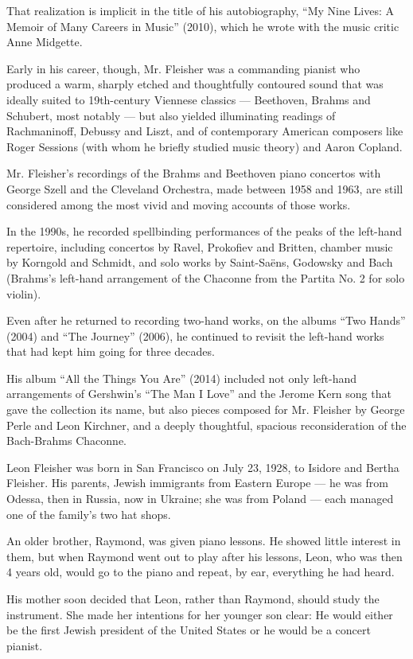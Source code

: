 That realization is implicit in the title of his autobiography, ``My
Nine Lives: A Memoir of Many Careers in Music'' (2010), which he wrote
with the music critic Anne Midgette.

Early in his career, though, Mr. Fleisher was a commanding pianist who
produced a warm, sharply etched and thoughtfully contoured sound that
was ideally suited to 19th-century Viennese classics --- Beethoven,
Brahms and Schubert, most notably --- but also yielded illuminating
readings of Rachmaninoff, Debussy and Liszt, and of contemporary
American composers like Roger Sessions (with whom he briefly studied
music theory) and Aaron Copland.

Mr. Fleisher's recordings of the Brahms and Beethoven piano concertos
with George Szell and the Cleveland Orchestra, made between 1958 and
1963, are still considered among the most vivid and moving accounts of
those works.

In the 1990s, he recorded spellbinding performances of the peaks of the
left-hand repertoire, including concertos by Ravel, Prokofiev and
Britten, chamber music by Korngold and Schmidt, and solo works by
Saint-Saëns, Godowsky and Bach (Brahms's left-hand arrangement of the
Chaconne from the Partita No. 2 for solo violin).

Even after he returned to recording two-hand works, on the albums ``Two
Hands'' (2004) and ``The Journey'' (2006), he continued to revisit the
left-hand works that had kept him going for three decades.

His album ``All the Things You Are'' (2014) included not only left-hand
arrangements of Gershwin's ``The Man I Love'' and the Jerome Kern song
that gave the collection its name, but also pieces composed for Mr.
Fleisher by George Perle and Leon Kirchner, and a deeply thoughtful,
spacious reconsideration of the Bach-Brahms Chaconne.

Leon Fleisher was born in San Francisco on July 23, 1928, to Isidore and
Bertha Fleisher. His parents, Jewish immigrants from Eastern Europe ---
he was from Odessa, then in Russia, now in Ukraine; she was from Poland
--- each managed one of the family's two hat shops.

An older brother, Raymond, was given piano lessons. He showed little
interest in them, but when Raymond went out to play after his lessons,
Leon, who was then 4 years old, would go to the piano and repeat, by
ear, everything he had heard.

His mother soon decided that Leon, rather than Raymond, should study the
instrument. She made her intentions for her younger son clear: He would
either be the first Jewish president of the United States or he would be
a concert pianist.

